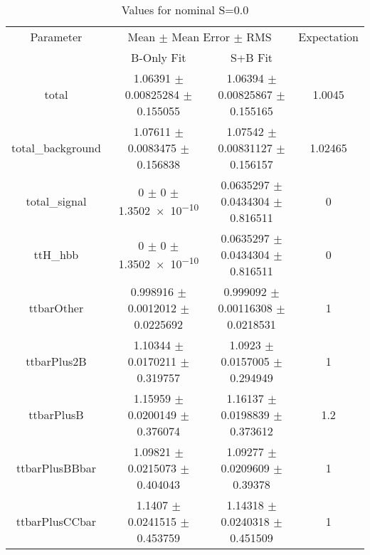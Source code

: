 \begin{table}
\centering
\caption{Values for nominal S=0.0}
\begin{tabular}{cccc}
\toprule
Parameter & \multicolumn{2}{c}{Mean $\pm$ Mean Error $\pm$ RMS} & Expectation\\
 & B-Only Fit & S+B Fit & \\
\midrule
total & \num{1.06391} $\pm$ \num{0.00825284} $\pm$ \num{0.155055} & \num{1.06394} $\pm$ \num{0.00825867} $\pm$ \num{0.155165} & \num{1.0045}\\
total\_background & \num{1.07611} $\pm$ \num{0.0083475} $\pm$ \num{0.156838} & \num{1.07542} $\pm$ \num{0.00831127} $\pm$ \num{0.156157} & \num{1.02465}\\
total\_signal & \num{0} $\pm$ \num{0} $\pm$ \num{1.3502e-10} & \num{0.0635297} $\pm$ \num{0.0434304} $\pm$ \num{0.816511} & \num{0}\\
ttH\_hbb & \num{0} $\pm$ \num{0} $\pm$ \num{1.3502e-10} & \num{0.0635297} $\pm$ \num{0.0434304} $\pm$ \num{0.816511} & \num{0}\\
ttbarOther & \num{0.998916} $\pm$ \num{0.0012012} $\pm$ \num{0.0225692} & \num{0.999092} $\pm$ \num{0.00116308} $\pm$ \num{0.0218531} & \num{1}\\
ttbarPlus2B & \num{1.10344} $\pm$ \num{0.0170211} $\pm$ \num{0.319757} & \num{1.0923} $\pm$ \num{0.0157005} $\pm$ \num{0.294949} & \num{1}\\
ttbarPlusB & \num{1.15959} $\pm$ \num{0.0200149} $\pm$ \num{0.376074} & \num{1.16137} $\pm$ \num{0.0198839} $\pm$ \num{0.373612} & \num{1.2}\\
ttbarPlusBBbar & \num{1.09821} $\pm$ \num{0.0215073} $\pm$ \num{0.404043} & \num{1.09277} $\pm$ \num{0.0209609} $\pm$ \num{0.39378} & \num{1}\\
ttbarPlusCCbar & \num{1.1407} $\pm$ \num{0.0241515} $\pm$ \num{0.453759} & \num{1.14318} $\pm$ \num{0.0240318} $\pm$ \num{0.451509} & \num{1}\\
\bottomrule
\end{tabular}
\end{table}